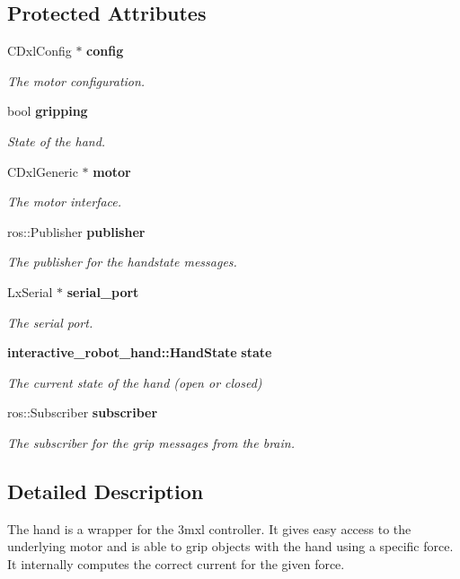 \subsection*{Protected Attributes}
\begin{DoxyCompactItemize}
\item 
C\-Dxl\-Config $\ast$ {\bf config}
\begin{DoxyCompactList}\small\item\em The motor configuration. \end{DoxyCompactList}\item 
bool {\bf gripping}
\begin{DoxyCompactList}\small\item\em State of the hand. \end{DoxyCompactList}\item 
C\-Dxl\-Generic $\ast$ {\bf motor}
\begin{DoxyCompactList}\small\item\em The motor interface. \end{DoxyCompactList}\item 
ros\-::\-Publisher {\bf publisher}
\begin{DoxyCompactList}\small\item\em The publisher for the handstate messages. \end{DoxyCompactList}\item 
Lx\-Serial $\ast$ {\bf serial\-\_\-port}
\begin{DoxyCompactList}\small\item\em The serial port. \end{DoxyCompactList}\item 
{\bf interactive\-\_\-robot\-\_\-hand\-::\-Hand\-State} {\bf state}
\begin{DoxyCompactList}\small\item\em The current state of the hand (open or closed) \end{DoxyCompactList}\item 
ros\-::\-Subscriber {\bf subscriber}
\begin{DoxyCompactList}\small\item\em The subscriber for the grip messages from the brain. \end{DoxyCompactList}\end{DoxyCompactItemize}


\subsection{Detailed Description}
The hand is a wrapper for the 3mxl controller. It gives easy access to the underlying motor and is able to grip objects with the hand using a specific force. It internally computes the correct current for the given force. 

